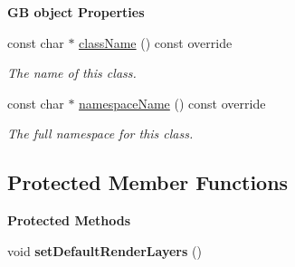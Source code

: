 \begin{Indent}\textbf{ GB object Properties}\par
\begin{DoxyCompactItemize}
\item 
const char $\ast$ \mbox{\hyperlink{classrev_1_1_scene_camera_a4fd93186927c55d2c4d48ebf941e248d}{class\+Name}} () const override
\begin{DoxyCompactList}\small\item\em The name of this class. \end{DoxyCompactList}\item 
const char $\ast$ \mbox{\hyperlink{classrev_1_1_scene_camera_a8d2a68f15a75323bd1d9a5d96c7a09bc}{namespace\+Name}} () const override
\begin{DoxyCompactList}\small\item\em The full namespace for this class. \end{DoxyCompactList}\end{DoxyCompactItemize}
\end{Indent}
\subsection*{Protected Member Functions}
\begin{Indent}\textbf{ Protected Methods}\par
\begin{DoxyCompactItemize}
\item 
\mbox{\label{classrev_1_1_scene_camera_ad72c0c48742afce947450dd362c522cd}} 
void {\bfseries set\+Default\+Render\+Layers} ()
\end{DoxyCompactItemize}
\end{Indent}
